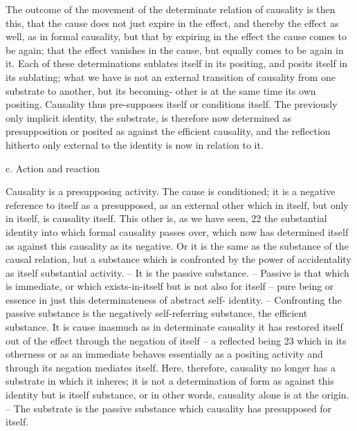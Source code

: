 The outcome of the movement of the determinate relation of causality
is then this, that the cause does not just expire in the effect, and thereby the
effect as well, as in formal causality, but that by expiring in the effect the
cause comes to be again; that the effect vanishes in the cause, but equally
comes to be again in it. Each of these determinations sublates itself in its
positing, and posits itself in its sublating; what we have is not an external
transition of causality from one substrate to another, but its becoming-
other is at the same time its own positing. Causality thus pre-supposes itself
or conditions itself. The previously only implicit identity, the substrate, is
therefore now determined as presupposition or posited as against the efficient
causality, and the reflection hitherto only external to the identity is now in
relation to it.

c. Action and reaction

Causality is a presupposing activity. The cause is conditioned; it is a negative
reference to itself as a presupposed, as an external other which in itself, but
only in itself, is causality itself. This other is, as we have seen, 22 the substantial
identity into which formal causality passes over, which now has determined
itself as against this causality as its negative. Or it is the same as the substance
of the causal relation, but a substance which is confronted by the power
of accidentality as itself substantial activity. – It is the passive substance. –
Passive is that which is immediate, or which exists-in-itself but is not also
for itself – pure being or essence in just this determinateness of abstract self-
identity. – Confronting the passive substance is the negatively self-referring
substance, the efficient substance. It is cause inasmuch as in determinate
causality it has restored itself out of the effect through the negation of itself –
a reflected being 23 which in its otherness or as an immediate behaves
essentially as a positing activity and through its negation mediates itself.
Here, therefore, causality no longer has a substrate in which it inheres; it is
not a determination of form as against this identity but is itself substance,
or in other words, causality alone is at the origin. – The substrate is the
passive substance which causality has presupposed for itself.


